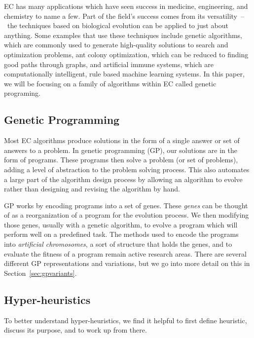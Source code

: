 \documentclass{sig-alternate}
\begin{document}
EC has many applications which have seen success in medicine, engineering, and chemistry to name a few. Part of the field's success comes from its versatility~--~the techniques based on biological evolution can be applied to just about anything. Some examples that use these techniques include genetic algorithms, which are commonly used to generate high-quality solutions to search and optimization problems, ant colony optimization, which can be reduced to finding good paths through graphs, and artificial immune systems, which are computationally intelligent, rule based machine learning systems. In this paper, we will be focusing on a family of algorithms within EC called genetic programing.

\subsection{Genetic Programming}
\label{sec:GP}
Most EC algorithms produce solutions in the form of a single answer or set of answers to a problem. In genetic programming (GP), our solutions are in the form of programs. These programs then solve a problem (or set of problems), adding a level of abstraction to the problem solving process. This also automates a large part of the algorithm design process by allowing an algorithm to evolve rather than designing and revising the algorithm by hand.

GP works by encoding programs into a set of genes. These \textit{genes} can be thought of as a reorganization of a program for the evolution process. We then modifying those genes, usually with a genetic algorithm, to evolve a program which will perform well on a predefined task. The methods used to encode the programs into \textit{artificial chromosomes}, a sort of structure that holds the genes, and to evaluate the fitness of a program remain active research areas. There are several different GP representations and variations, but we go into more detail on this in Section~\ref{sec:gpvariants}.

\subsection{Hyper-heuristics}
\label{sec:HH}
To better understand hyper-heuristics, we find it helpful to first define heuristic, discuss its purpose, and to work up from there.
\end{document}
